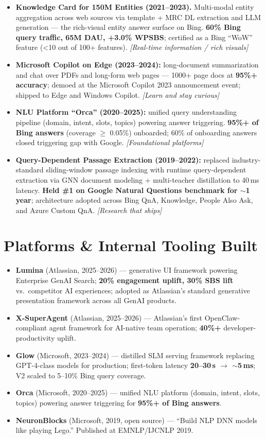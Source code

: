 \documentclass[10.5pt,letterpaper]{article}
\newcommand{\lp}[1]{\textcolor{blue!55!black}{\small\textit{[#1]}}}
\begin{document}
\begin{itemize}
  \item \textbf{Knowledge Card for 150M Entities (2021--2023).} Multi-modal entity aggregation across web sources via template + MRC DL extraction and LLM generation --- the rich-visual entity answer surface on Bing. \textbf{60\% Bing query traffic, 65M DAU, +3.0\% WPSBS}; certified as a Bing ``WoW'' feature (<10 out of 100+ features). \lp{Real-time information / rich visuals}
  \item \textbf{Microsoft Copilot on Edge (2023--2024):} long-document summarization and chat over PDFs and long-form web pages --- 1000+ page docs at \textbf{95\%+ accuracy}; demoed at the Microsoft Copilot 2023 announcement event; shipped to Edge and Windows Copilot. \lp{Learn and stay curious}
  \item \textbf{NLU Platform ``Orca'' (2020--2025):} unified query understanding pipeline (domain, intent, slots, topics) powering answer triggering. \textbf{95\%+ of Bing answers} (coverage $\ge$ 0.05\%) onboarded; 60\% of onboarding answers closed triggering gap with Google. \lp{Foundational platforms}
  \item \textbf{Query-Dependent Passage Extraction (2019--2022):} replaced industry-standard sliding-window passage indexing with runtime query-dependent extraction via GNN document modeling + multi-teacher distillation to 40\,ms latency. \textbf{Held \#1 on Google Natural Questions benchmark for $\sim$1 year}; architecture adopted across Bing QnA, Knowledge, People Also Ask, and Azure Custom QnA. \lp{Research that ships}
\end{itemize}

\section*{Platforms \& Internal Tooling Built}
\begin{itemize}
  \item \textbf{Lumina} (Atlassian, 2025--2026) --- generative UI framework powering Enterprise GenAI Search; \textbf{20\% engagement uplift, 30\% SBS lift} vs.\ competitor AI experiences; adopted as Atlassian's standard generative presentation framework across all GenAI products.
  \item \textbf{X-SuperAgent} (Atlassian, 2025--2026) --- Atlassian's first OpenClaw-compliant agent framework for AI-native team operation; \textbf{40\%+} developer-productivity uplift.
  \item \textbf{Glow} (Microsoft, 2023--2024) --- distilled SLM serving framework replacing GPT-4-class models for production; first-token latency \textbf{20--30\,s $\to$ $\sim$5\,ms}; V2 scaled to 5--10\% Bing query coverage.
  \item \textbf{Orca} (Microsoft, 2020--2025) --- unified NLU platform (domain, intent, slots, topics) powering answer triggering for \textbf{95\%+ of Bing answers}.
  \item \textbf{NeuronBlocks} (Microsoft, 2019, open source) --- ``Build NLP DNN models like playing Lego.'' Published at EMNLP/IJCNLP 2019.
\end{itemize}
\end{document}
